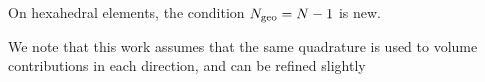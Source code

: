 \documentclass{svjour3}                     %
\renewcommand{\hat}{\widehat}
\renewcommand{\tilde}{\widetilde}
\newcommand{\pd}[2]{\frac{\partial#1}{\partial#2}}
\newcommand{\LRp}[1]{\left( #1 \right)}
\newcommand{\LRl}[1]{\left. #1 \right|}
\newcommand{\Grad} {\ensuremath{\nabla}}
\renewcommand{\note}[1]{{\color{blue}{#1}}}
\begin{document}
On hexahedral elements, the condition $N_{\rm geo} = N-1$ is new.  \note{Finish}

We note that this work assumes that the same quadrature is used to volume contributions in each direction, and can be refined slightly 
\note{add line DG}




%
\end{document}
